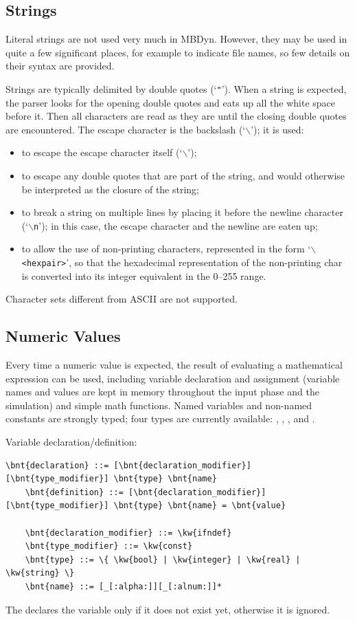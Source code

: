 \subsection{Strings}
Literal strings are not used very much in MBDyn.
However, they may be used in quite a few significant places,
for example to indicate file names, so few details on their syntax
are provided.

Strings are typically delimited by double quotes (`\texttt{"}').
When a string is expected, the parser looks for the opening 
double quotes and eats up all the white space before it.
Then all characters are read as they are until the closing 
double quotes are encountered.
The escape character is the backslash (`$\backslash$'); it is used:
\begin{itemize}
	\item to escape the escape character itself (`$\backslash$');
	\item to escape any double quotes that are part of the string,
		and would otherwise be interpreted as the closure
		of the string;
	\item to break a string on multiple lines by placing it
		before the newline character (`\texttt{$\backslash$n}');
		in this case, the escape character and the newline
		are eaten up;
	\item to allow the use of non-printing characters,
		represented in the form `\texttt{$\backslash$<hexpair>}',
		so that the hexadecimal representation of the
		non-printing char is converted into its integer
		equivalent in the 0--255 range.
\end{itemize}
Character sets different from ASCII are not supported.



\subsection{Numeric Values}
Every time a numeric value is expected, the result of evaluating 
a mathematical expression can be used, including variable declaration 
and assignment (variable names and values are kept in memory throughout
the input phase and the simulation) and simple math functions.
Named variables and non-named constants are strongly typed; four types are
currently available: , , , and .

Variable declaration/definition:
\begin{Verbatim}[commandchars=\\\{\}]
    \bnt{declaration} ::= [\bnt{declaration_modifier}] [\bnt{type_modifier}] \bnt{type} \bnt{name}
    \bnt{definition} ::= [\bnt{declaration_modifier}] [\bnt{type_modifier}] \bnt{type} \bnt{name} = \bnt{value}

    \bnt{declaration_modifier} ::= \kw{ifndef}
    \bnt{type_modifier} ::= \kw{const}
    \bnt{type} ::= \{ \kw{bool} | \kw{integer} | \kw{real} | \kw{string} \}
    \bnt{name} ::= [_[:alpha:]][_[:alnum:]]*
\end{Verbatim}
The   declares the variable only if it does not exist yet,
otherwise it is ignored.

